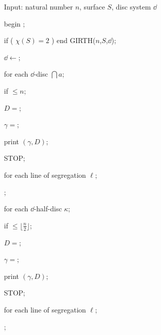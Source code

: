 \begin{ttfamily}
Input: natural number $n$, surface $S$, disc system $\dd$

\smallskip

begin ;

\hspace{20 pt}if ( $\chi(S)=2$ ) end GIRTH($n$,$S$,$\dd$);

\hspace{20 pt}$\dd\leftarrow$\locallyminimize{$\dd$};

\hspace{20 pt}for each $\dd$-disc $\dint{a}$;

\hspace{40 pt}if $\leq n$;

\hspace{60 pt}$D=$;

\hspace{60 pt}$\gamma=$;

\hspace{60 pt}print $(\gamma, D)$;

\hspace{60 pt}STOP;

\hspace{40 pt}for each line of segregation $\ell$;

\hspace{60 pt};

\hspace{20 pt}for each $\dd$-half-disc $\kappa$;

\hspace{40 pt}if \segregation{$\kappa$}$\leq\lfloor\frac{n}{2}\rfloor$;

\hspace{60 pt}$D=$\constructdisc{$\kappa$};

\hspace{60 pt}$\gamma=$;

\hspace{60 pt}print $(\gamma, D)$;

\hspace{60 pt}STOP;

\hspace{40 pt}for each line of segregation $\ell$;

\hspace{60 pt};

\end{ttfamily}

